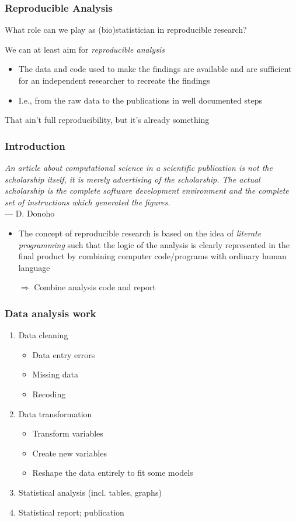 \documentclass[paper=screen,mathserif]{beamer}\usepackage[]{graphicx}\usepackage[]{color}
\begin{document}
\begin{frame}
  \frametitle{Reproducible Analysis} 

  What role can we play as (bio)statistician in reproducible
  research?\pause
  
  \vspace{1cm}
  We can at least aim for {\em reproducible analysis}
  \begin{itemize}
  \item The data and code used to make the findings are available and
    are sufficient for an independent researcher to recreate the
    findings
  \item I.e., from the raw data to the publications in well documented
    steps
  \end{itemize}\vspace{0.5cm}
  That ain't full reproducibility, but it's already something
\end{frame}

\begin{frame}
  \frametitle{Introduction}
  {\em An article about computational science in a scientific
    publication is not the scholarship itself, it is merely advertising
    of the scholarship. The actual scholarship is the complete software
    development environment and the complete set of instructions which
    generated the figures.}\\
  --- D. Donoho
  
  \begin{itemize}
  \item The concept of reproducible research is based on the idea of
    {\em literate programming} such that the logic of the analysis is
    clearly represented in the final product by combining computer
    code/programs with ordinary human language
    
    $\Rightarrow$ Combine analysis code and report
  \end{itemize}
\end{frame}


\begin{frame}
  \frametitle{Data analysis work}
  \begin{enumerate}
  \item Data cleaning
    \begin{itemize}
    \item Data entry errors
    \item Missing data
    \item Recoding
    \end{itemize}
  \item Data transformation
    \begin{itemize}
    \item Transform variables
    \item Create new variables
    \item Reshape the data entirely to fit some models
    \end{itemize}
  \item Statistical analysis (incl. tables, graphs)
  \item Statistical report; publication
  \end{enumerate}
\end{frame}
\end{document}
